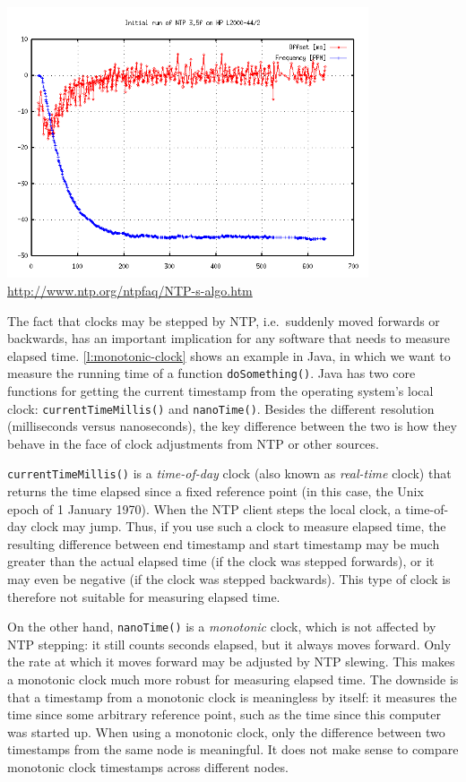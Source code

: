 \begin{frame}[plain]
    \label{s:ntp-graph}
    \begin{center}
        \includegraphics[height=8cm]{images/ntp-graph.png}
        \scriptsize\url{http://www.ntp.org/ntpfaq/NTP-s-algo.htm}
    \end{center}
\end{frame}
\label{l:ntp-graph}

The fact that clocks may be stepped by NTP, i.e.\ suddenly moved forwards or backwards, has an important implication for any software that needs to measure elapsed time.
\autoref{l:monotonic-clock} shows an example in Java, in which we want to measure the running time of a function \verb|doSomething()|.
Java has two core functions for getting the current timestamp from the operating system's local clock: \verb|currentTimeMillis()| and \verb|nanoTime()|.
Besides the different resolution (milliseconds versus nanoseconds), the key difference between the two is how they behave in the face of clock adjustments from NTP or other sources.

\verb|currentTimeMillis()| is a \emph{time-of-day} clock (also known as \emph{real-time} clock) that returns the time elapsed since a fixed reference point (in this case, the Unix epoch of 1 January 1970).
When the NTP client steps the local clock, a time-of-day clock may jump.
Thus, if you use such a clock to measure elapsed time, the resulting difference between end timestamp and start timestamp may be much greater than the actual elapsed time (if the clock was stepped forwards), or it may even be negative (if the clock was stepped backwards).
This type of clock is therefore not suitable for measuring elapsed time.

On the other hand, \verb|nanoTime()| is a \emph{monotonic} clock, which is not affected by NTP stepping: it still counts seconds elapsed, but it always moves forward.
Only the rate at which it moves forward may be adjusted by NTP slewing.
This makes a monotonic clock much more robust for measuring elapsed time.
The downside is that a timestamp from a monotonic clock is meaningless by itself: it measures the time since some arbitrary reference point, such as the time since this computer was started up.
When using a monotonic clock, only the difference between two timestamps from the same node is meaningful.
It does not make sense to compare monotonic clock timestamps across different nodes.


